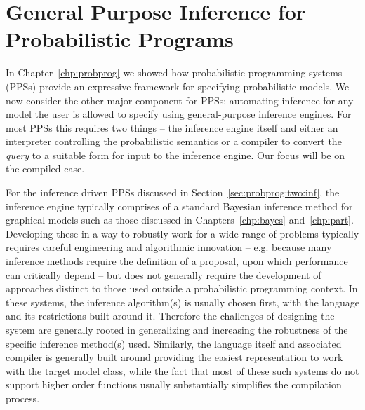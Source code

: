 
\chapter{General Purpose Inference for Probabilistic Programs}
\label{chp:proginf}

In Chapter~\ref{chp:probprog} we showed how probabilistic programming systems (PPSs) provide
an expressive framework for specifying probabilistic models.  We now consider the other major component
for PPSs: automating inference for any model the user is allowed to specify using general-purpose
inference engines.  For most PPSs this requires two things --  the inference engine itself and
either an interpreter controlling the probabilistic semantics or a compiler to convert the \emph{query} to a
suitable form for input to the inference engine.   Our focus will be on the compiled case. 

For the inference
driven PPSs discussed in Section~\ref{sec:probprog:two:inf}, the inference engine typically comprises of
a standard Bayesian inference method for graphical models such as those discussed in Chapters~\ref{chp:bayes}
and~\ref{chp:part}.  Developing these in a way to robustly work for a wide range of problems typically
requires careful engineering and algorithmic innovation -- e.g. because many inference methods require the definition of
a proposal, upon which performance can critically depend -- but does not generally require the development 
of approaches distinct to those used outside a probabilistic programming context.  In these 
systems, the inference algorithm(s) is usually chosen first, with the language and its restrictions built around it.
Therefore the challenges of designing the system are generally rooted in generalizing and increasing the robustness of the 
specific inference method(s) used.  Similarly, the language itself and associated compiler is generally built
around providing the easiest representation to work with the target model class, while the fact that most of
these such systems do not support higher order functions usually substantially simplifies the compilation
process.

